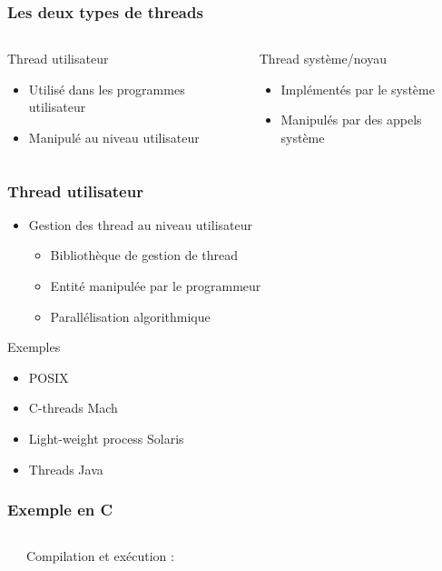 \begin{frame}
 \frametitle{Les deux types de threads}
 \begin{columns}
 \begin{block}{Thread utilisateur}
 \begin{itemize}
 \item Utilisé dans les programmes utilisateur
 \item Manipulé au niveau utilisateur
 \end{itemize}
 \end{block}
 \begin{block}{Thread système/noyau}
 \begin{itemize}
 \item Implémentés par le système
 \item Manipulés par des appels système
 \end{itemize}
 \end{block}
 \end{columns}
\end{frame}


\begin{frame}
 \frametitle{Thread utilisateur}
 \begin{itemize}
 \item Gestion des thread au niveau utilisateur
 \begin{itemize}
 \item Bibliothèque de gestion de thread
 \item Entité manipulée par le programmeur
 \item Parallélisation algorithmique
 \end{itemize}
 \end{itemize}


 \begin{exampleblock}{Exemples}
 \begin{itemize}
 \item POSIX
 \item C-threads Mach
 \item Light-weight process Solaris
 \item Threads Java
 \end{itemize}
 \end{exampleblock}
\end{frame}


\begin{frame}
  \frametitle{Exemple en C}
  \begin{columns}
    \begin{tiny}
    
    \end{tiny}
    Compilation et exécution :
    \begin{tiny}
      
    \end{tiny}
  \end{columns}
\end{frame}


